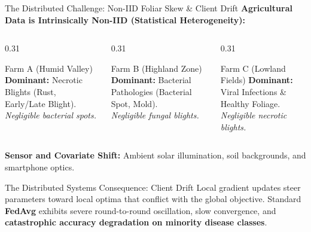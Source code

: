 \documentclass[aspectratio=169]{beamer}
\begin{document}
\begin{frame}{The Distributed Challenge: Non-IID Foliar Skew \& Client Drift}
    \textbf{Agricultural Data is Intrinsically Non-IID (Statistical Heterogeneity):}
    \begin{columns}[T]
        \begin{column}{0.31\textwidth}
            \begin{exampleblock}{Farm A (Humid Valley)}
                \textbf{Dominant:} Necrotic Blights (Rust, Early/Late Blight).\\
                \textit{Negligible bacterial spots.}
            \end{exampleblock}
        \end{column}
        \begin{column}{0.31\textwidth}
            \begin{exampleblock}{Farm B (Highland Zone)}
                \textbf{Dominant:} Bacterial Pathologies (Bacterial Spot, Mold).\\
                \textit{Negligible fungal blights.}
            \end{exampleblock}
        \end{column}
        \begin{column}{0.31\textwidth}
            \begin{exampleblock}{Farm C (Lowland Fields)}
                \textbf{Dominant:} Viral Infections \& Healthy Foliage.\\
                \textit{Negligible necrotic blights.}
            \end{exampleblock}
        \end{column}
    \end{columns}
    \vspace{0.12cm}
    \textbf{Sensor and Covariate Shift:} Ambient solar illumination, soil backgrounds, and smartphone optics.
    \vspace{0.12cm}
    \begin{alertblock}{The Distributed Systems Consequence: Client Drift}
        Local gradient updates steer parameters toward local optima that conflict with the global objective. Standard \textbf{FedAvg} exhibits severe round-to-round oscillation, slow convergence, and \textbf{catastrophic accuracy degradation on minority disease classes}.
    \end{alertblock}
\end{frame}
\end{document}
